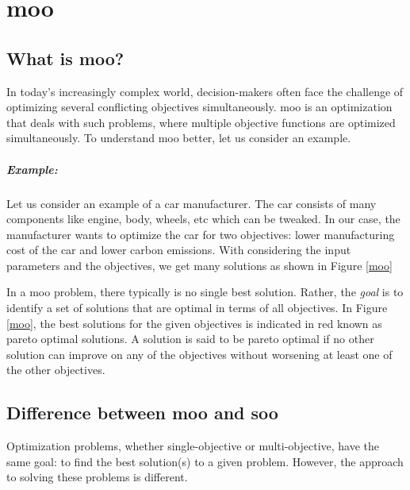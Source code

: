 \chapter{\acrfull{moo}}

\section{What is \acrshort{moo}?} \label{what is moo}
In today's increasingly complex world, decision-makers often face the challenge of optimizing several conflicting objectives simultaneously. \acrfull{moo} 
is an optimization that deals with such problems, where multiple objective functions are optimized simultaneously. To understand \acrshort{moo} better, 
let us consider an example.

\paragraph{Example:}
Let us consider an example of a car manufacturer. The car consists of many components like engine, body, wheels, etc which can be
tweaked. In our case, the manufacturer wants to optimize the car for two objectives: lower manufacturing cost of the car and lower carbon emissions. With 
considering the input parameters and the objectives, we get many solutions as shown in Figure \ref{moo}

\begin{figure}[!h]
    
\end{figure}
In a \acrshort{moo} problem, there typically is no single best solution. Rather, the \textit{goal} is to identify a set of solutions that are optimal in terms 
of all objectives. In Figure \ref{moo}, the best solutions for the given objectives is indicated in red known as pareto optimal solutions. A solution is said 
to be pareto optimal if no other solution can improve on any of the objectives without worsening at least one of the other objectives.

\section{Difference between \acrshort{moo} and \acrshort{soo}}
Optimization problems, whether single-objective or multi-objective, have the same goal: to find the best solution(s) to a given problem. However, the approach
to solving these problems is different. 

